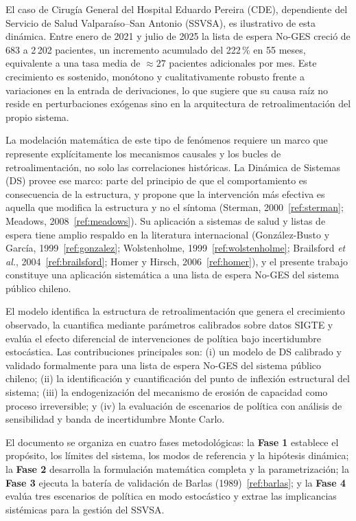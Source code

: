 \documentclass[12pt,a4paper]{article}
\begin{document}
El caso de Cirugía General del Hospital Eduardo Pereira (CDE), dependiente del Servicio de Salud Valparaíso--San Antonio (SSVSA), es ilustrativo de esta dinámica. Entre enero de 2021 y julio de 2025 la lista de espera No-GES creció de 683 a 2\,202 pacientes, un incremento acumulado del 222\,\% en 55 meses, equivalente a una tasa media de $\approx 27$ pacientes adicionales por mes. Este crecimiento es sostenido, monótono y cualitativamente robusto frente a variaciones en la entrada de derivaciones, lo que sugiere que su causa raíz no reside en perturbaciones exógenas sino en la arquitectura de retroalimentación del propio sistema.

La modelación matemática de este tipo de fenómenos requiere un marco que represente explícitamente los mecanismos causales y los bucles de retroalimentación, no solo las correlaciones históricas. La Dinámica de Sistemas (DS) provee ese marco: parte del principio de que el comportamiento es consecuencia de la estructura, y propone que la intervención más efectiva es aquella que modifica la estructura y no el síntoma (Sterman, 2000~\ref{ref:sterman}; Meadows, 2008~\ref{ref:meadows}). Su aplicación a sistemas de salud y listas de espera tiene amplio respaldo en la literatura internacional (González-Busto y García, 1999~\ref{ref:gonzalez}; Wolstenholme, 1999~\ref{ref:wolstenholme}; Brailsford \textit{et al.}, 2004~\ref{ref:brailsford}; Homer y Hirsch, 2006~\ref{ref:homer}), y el presente trabajo constituye una aplicación sistemática a una lista de espera No-GES del sistema público chileno.

El modelo identifica la estructura de retroalimentación que genera el crecimiento observado, la cuantifica mediante parámetros calibrados sobre datos SIGTE y evalúa el efecto diferencial de intervenciones de política bajo incertidumbre estocástica. Las contribuciones principales son: (i) un modelo de DS calibrado y validado formalmente para una lista de espera No-GES del sistema público chileno; (ii) la identificación y cuantificación del punto de inflexión estructural del sistema; (iii) la endogenización del mecanismo de erosión de capacidad como proceso irreversible; y (iv) la evaluación de escenarios de política con análisis de sensibilidad y banda de incertidumbre Monte Carlo.

El documento se organiza en cuatro fases metodológicas: la \textbf{Fase 1} establece el propósito, los límites del sistema, los modos de referencia y la hipótesis dinámica; la \textbf{Fase 2} desarrolla la formulación matemática completa y la parametrización; la \textbf{Fase 3} ejecuta la batería de validación de Barlas (1989)~\ref{ref:barlas}; y la \textbf{Fase 4} evalúa tres escenarios de política en modo estocástico y extrae las implicancias sistémicas para la gestión del SSVSA.
\end{document}
